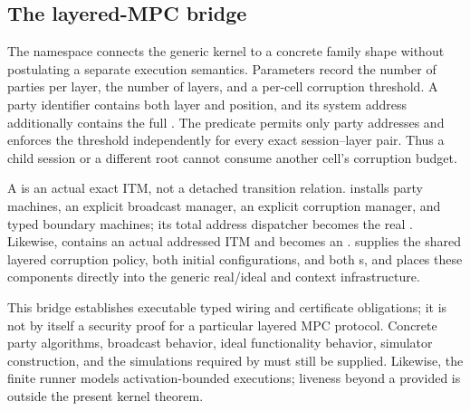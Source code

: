 \subsection{The layered-MPC bridge}

The  namespace connects the generic kernel to a concrete family
shape without postulating a separate execution semantics.  Parameters record
the number of parties per layer, the number of layers, and a per-cell
corruption threshold.  A party identifier contains both layer and position,
and its system address additionally contains the full .  The
predicate  permits only party addresses and enforces
the threshold independently for every exact session--layer pair.  Thus a child
session or a different root cannot consume another cell's corruption budget.

A  is an actual exact ITM, not a detached transition
relation.   installs party machines, an explicit
broadcast manager, an explicit corruption manager, and typed boundary
machines; its total address dispatcher becomes the real .
Likewise,  contains an actual addressed ITM and becomes
an .   supplies the shared
layered corruption policy, both initial configurations, and both
s, and
 places these components directly into the
generic real/ideal and context infrastructure.

\begin{scopeboundary}
This bridge establishes executable typed wiring and certificate obligations;
it is not by itself a security proof for a particular layered MPC protocol.
Concrete party algorithms, broadcast behavior, ideal functionality behavior,
simulator construction, and the simulations required by 
must still be supplied.  Likewise, the finite runner models activation-bounded
executions; liveness beyond a provided  is outside the
present kernel theorem.
\end{scopeboundary}
